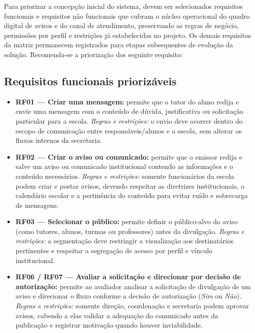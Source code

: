 \documentclass[a4paper,12pt]{report}
\begin{document}
Para priorizar a concepção inicial do sistema, devem ser selecionados requisitos funcionais e requisitos não funcionais que cubram o núcleo operacional do quadro digital de avisos e do canal de atendimento, preservando as regras de negócio, permissões por perfil e restrições já estabelecidas no projeto. Os demais requisitos da matriz permanecem registrados para etapas subsequentes de evolução da solução. Recomenda-se a priorização dos seguinte requisito:

\subsection{Requisitos funcionais priorizáveis}

\begin{itemize}

    \item \textbf{RF01 — Criar uma mensagem:} permite que o tutor do aluno redija e envie uma mensagem com o conteúdo de dúvida, justificativa ou solicitação particular para a escola. \textit{Regras e restrições:} o envio deve ocorrer dentro do escopo de comunicação entre responsáveis/alunos e a escola, sem alterar os fluxos internos da secretaria.
    
    \item \textbf{RF02 — Criar o aviso ou comunicado:} permite que o emissor redija e salve um aviso ou comunicado institucional contendo as informações e o conteúdo necessários. \textit{Regras e restrições:} somente funcionários da escola podem criar e postar avisos, devendo respeitar as diretrizes institucionais, o calendário escolar e a pertinência do conteúdo para evitar ruído e sobrecarga de mensagens.
    
    \item \textbf{RF03 — Selecionar o público:} permite definir o público-alvo do aviso (como tutores, alunos, turmas ou professores) antes da divulgação. \textit{Regras e restrições:} a segmentação deve restringir a visualização aos destinatários pertinentes e respeitar a segregação de acesso por perfil e vínculo institucional.
    
    \item \textbf{RF06 / RF07 — Avaliar a solicitação e direcionar por decisão de autorização:} permite ao avaliador analisar a solicitação de divulgação de um aviso e direcionar o fluxo conforme a decisão de autorização (\textit{Sim} ou \textit{Não}). \textit{Regras e restrições:} somente direção, coordenação e secretaria podem aprovar avisos, cabendo a elas validar a adequação do comunicado antes da publicação e registrar motivação quando houver inviabilidade.
    

\end{itemize}
\end{document}
